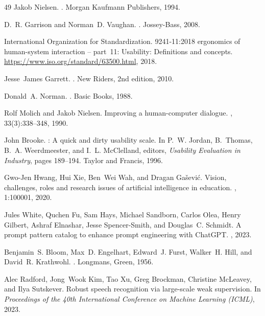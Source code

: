 \begin{thebibliography}{49}
Jakob Nielsen.
.
\newblock Morgan Kaufmann Publishers, 1994.


D.~R. Garrison and Norman~D. Vaughan.
.
\newblock Jossey-Bass, 2008.

{International Organization for Standardization}.
 9241-11:2018 ergonomics of human-system interaction -- part~11: Usability: Definitions and concepts.
\newblock \url{https://www.iso.org/standard/63500.html}, 2018.

Jesse~James Garrett.
.
\newblock New Riders, 2nd edition, 2010.

Donald~A. Norman.
.
\newblock Basic Books, 1988.

Rolf Molich and Jakob Nielsen.
\newblock Improving a human-computer dialogue.
, 33(3):338--348, 1990.

John Brooke.
: A quick and dirty usability scale.
\newblock In P.~W. Jordan, B.~Thomas, B.~A. Weerdmeester, and I.~L. McClelland, editors, {\em Usability Evaluation in Industry}, pages 189--194. Taylor and Francis, 1996.

Gwo-Jen Hwang, Hui Xie, Ben~Wei Wah, and Dragan Ga\v{s}evi\'{c}.
\newblock Vision, challenges, roles and research issues of artificial intelligence in education.
, 1:100001, 2020.


Jules White, Quchen Fu, Sam Hays, Michael Sandborn, Carlos Olea, Henry Gilbert, Ashraf Elnashar, Jesse Spencer-Smith, and Douglas~C. Schmidt.
\newblock A prompt pattern catalog to enhance prompt engineering with {ChatGPT}.
, 2023.

Benjamin~S. Bloom, Max~D. Engelhart, Edward~J. Furst, Walker~H. Hill, and David~R. Krathwohl.
.
\newblock Longmans, Green, 1956.

Alec Radford, Jong~Wook Kim, Tao Xu, Greg Brockman, Christine McLeavey, and Ilya Sutskever.
\newblock Robust speech recognition via large-scale weak supervision.
\newblock In {\em Proceedings of the 40th International Conference on Machine Learning ({ICML})}, 2023.


\end{thebibliography}
